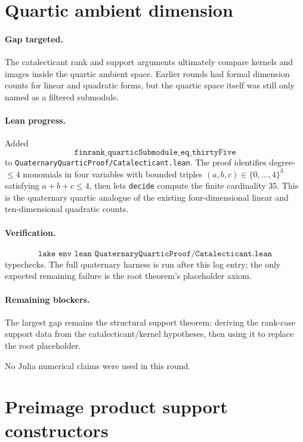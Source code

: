 \documentclass[11pt]{article}
\begin{document}
\section*{Quartic ambient dimension}

\paragraph{Gap targeted.}
The catalecticant rank and support arguments ultimately compare kernels and
images inside the quartic ambient space.  Earlier rounds had formal dimension
counts for linear and quadratic forms, but the quartic space itself was still
only named as a filtered submodule.

\paragraph{Lean progress.}
Added
\[
\texttt{finrank\_quarticSubmodule\_eq\_thirtyFive}
\]
to \texttt{QuaternaryQuarticProof/Catalecticant.lean}.  The proof identifies
degree-\(\leq 4\) monomials in four variables with bounded triples
\((a,b,c)\in\{0,\ldots,4\}^3\) satisfying \(a+b+c\leq 4\), then lets
\texttt{decide} compute the finite cardinality \(35\).  This is the
quaternary quartic analogue of the existing four-dimensional linear and
ten-dimensional quadratic counts.

\paragraph{Verification.}
\[
\texttt{lake env lean QuaternaryQuarticProof/Catalecticant.lean}
\]
typechecks.  The full quaternary harness is run after this log entry; the only
expected remaining failure is the root theorem's placeholder axiom.

\paragraph{Remaining blockers.}
The largest gap remains the structural support theorem: deriving the rank-case
support data from the catalecticant/kernel hypotheses, then using it to replace
the root placeholder.

No Julia numerical claims were used in this round.

\section*{Preimage product support constructors}
\end{document}
